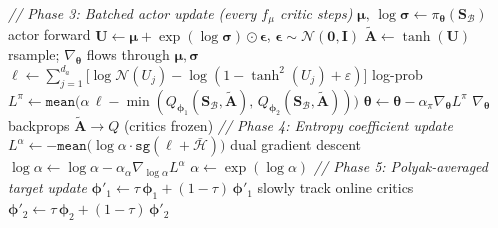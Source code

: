 \documentclass[11pt]{article}
\begin{document}
\begin{algorithm}[p]
\begin{minipage}[t]{0.68\linewidth}
\begin{algorithmic}[1]
    \Statex \hspace{\algorithmicindent}\textit{// Phase 3: Batched actor update (every $f_\mu$ critic steps)}
        \State $\boldsymbol{\mu},\, \log\boldsymbol{\sigma} \gets \pi_{\boldsymbol{\theta}}(\mathbf{S}_\mathcal{B})$ \hfill actor forward
        \State $\mathbf{U} \gets \boldsymbol{\mu} + \exp(\log\boldsymbol{\sigma}) \odot \boldsymbol{\epsilon}$, \;\; $\boldsymbol{\epsilon} \sim \mathcal{N}(\mathbf{0}, \mathbf{I})$
        \State $\tilde{\mathbf{A}} \gets \tanh(\mathbf{U})$ \hfill rsample; $\nabla_{\boldsymbol{\theta}}$ flows through $\boldsymbol{\mu}, \boldsymbol{\sigma}$
        \State $\boldsymbol{\ell} \gets \sum_{j=1}^{d_a}\big[\log\mathcal{N}(U_j) - \log(1 {-} \tanh^2\!(U_j) {+} \varepsilon)\big]$ \hfill log-prob
        \State $L^\pi \!\gets\! \texttt{mean}\!\big(\alpha\,\boldsymbol{\ell} - \min(Q_{\boldsymbol{\phi}_1}(\mathbf{S}_\mathcal{B}, \tilde{\mathbf{A}}),\, Q_{\boldsymbol{\phi}_2}(\mathbf{S}_\mathcal{B}, \tilde{\mathbf{A}}))\big)$
        \State $\boldsymbol{\theta} \gets \boldsymbol{\theta} - \alpha_\pi \nabla_{\boldsymbol{\theta}} L^\pi$ \hfill $\nabla_{\boldsymbol{\theta}}$ backprops $\tilde{\mathbf{A}} \to Q$ (critics frozen)
        \Statex \hspace{\algorithmicindent}\hspace{\algorithmicindent}\textit{// Phase 4: Entropy coefficient update}
        \State $L^\alpha \gets -\texttt{mean}\!\big(\log\alpha \cdot \texttt{sg}(\boldsymbol{\ell} + \bar{\mathcal{H}})\big)$ \hfill dual gradient descent
        \State $\log\alpha \gets \log\alpha - \alpha_\alpha \nabla_{\log\alpha} L^\alpha$
        \State $\alpha \gets \exp(\log\alpha)$
    \EndIf
    \Statex \hspace{\algorithmicindent}\textit{// Phase 5: Polyak-averaged target update}
    \State $\boldsymbol{\phi}'_1 \gets \tau\,\boldsymbol{\phi}_1 + (1 - \tau)\,\boldsymbol{\phi}'_1$ \hfill slowly track online critics
    \State $\boldsymbol{\phi}'_2 \gets \tau\,\boldsymbol{\phi}_2 + (1 - \tau)\,\boldsymbol{\phi}'_2$
\EndFor
\end{algorithmic}
\end{minipage}
\end{algorithm}
\end{document}
